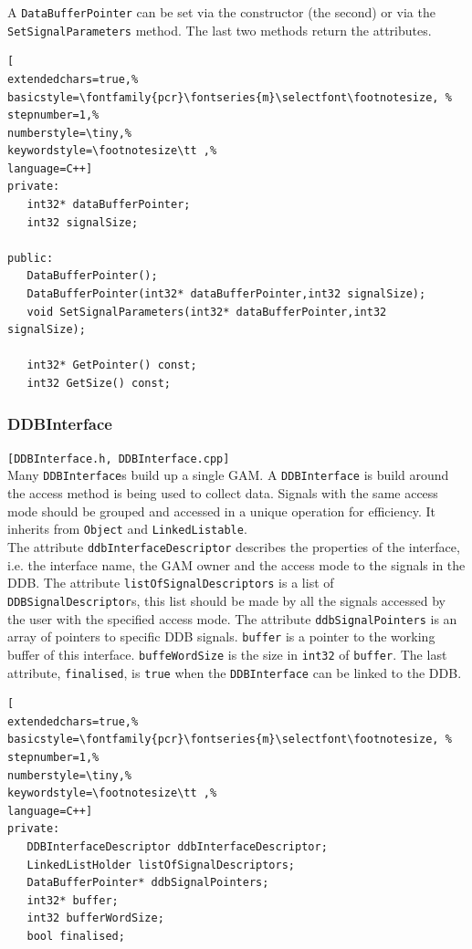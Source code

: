 A \texttt{DataBufferPointer} can be set via the constructor (the second) or via the \texttt{SetSignalParameters} method. The last two methods return the attributes.

\begin{lstlisting}[
extendedchars=true,%
basicstyle=\fontfamily{pcr}\fontseries{m}\selectfont\footnotesize, %
stepnumber=1,%
numberstyle=\tiny,%
keywordstyle=\footnotesize\tt ,%
language=C++]
private:
   int32* dataBufferPointer;
   int32 signalSize;

public:
   DataBufferPointer();
   DataBufferPointer(int32* dataBufferPointer,int32 signalSize);
   void SetSignalParameters(int32* dataBufferPointer,int32 signalSize);

   int32* GetPointer() const;
   int32 GetSize() const;
\end{lstlisting}



\subsubsection{DDBInterface}
\texttt{[DDBInterface.h, DDBInterface.cpp]}\\
Many \texttt{DDBInterface}s build up a single GAM. A \texttt{DDBInterface} is build around the access method is being used to collect data. Signals with the same access mode should be grouped and accessed in a unique operation for efficiency. It inherits from \texttt{Object} and \texttt{LinkedListable}. \\

The attribute \texttt{ddbInterfaceDescriptor} describes the properties of the interface, i.e. the interface name, the GAM owner and the access mode to the signals in the DDB.
The attribute \texttt{listOfSignalDescriptors} is a list of \texttt{DDBSignalDescriptor}s, this list should be made by all the signals accessed by the user with the specified access mode.
The attribute \texttt{ddbSignalPointers} is an array of pointers to specific DDB signals.
\texttt{buffer} is a pointer to the working buffer of this interface. \texttt{buffeWordSize} is the size in \texttt{int32} of \texttt{buffer}.
The last attribute, \texttt{finalised}, is \texttt{true} when the \texttt{DDBInterface} can be linked to the DDB.
\begin{lstlisting}[
extendedchars=true,%
basicstyle=\fontfamily{pcr}\fontseries{m}\selectfont\footnotesize, %
stepnumber=1,%
numberstyle=\tiny,%
keywordstyle=\footnotesize\tt ,%
language=C++]
private:
   DDBInterfaceDescriptor ddbInterfaceDescriptor;
   LinkedListHolder listOfSignalDescriptors;
   DataBufferPointer* ddbSignalPointers;
   int32* buffer;
   int32 bufferWordSize;
   bool finalised;
\end{lstlisting}
   
